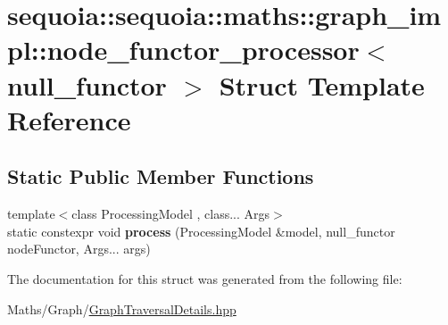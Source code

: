 \hypertarget{structsequoia_1_1sequoia_1_1maths_1_1graph__impl_1_1node__functor__processor_3_01null__functor_01_4}{}\section{sequoia\+::sequoia\+::maths\+::graph\+\_\+impl\+::node\+\_\+functor\+\_\+processor$<$ null\+\_\+functor $>$ Struct Template Reference}
\label{structsequoia_1_1sequoia_1_1maths_1_1graph__impl_1_1node__functor__processor_3_01null__functor_01_4}
\subsection*{Static Public Member Functions}
\begin{DoxyCompactItemize}
\item 
\mbox{\label{structsequoia_1_1sequoia_1_1maths_1_1graph__impl_1_1node__functor__processor_3_01null__functor_01_4_ac6a58698cb3b68ed2d7ea0a1ca32aa84}} 
{\footnotesize template$<$class Processing\+Model , class... Args$>$ }\\static constexpr void {\bfseries process} (Processing\+Model \&model, null\+\_\+functor node\+Functor, Args... args)
\end{DoxyCompactItemize}


The documentation for this struct was generated from the following file\+:\begin{DoxyCompactItemize}
\item 
Maths/\+Graph/\mbox{\hyperlink{_graph_traversal_details_8hpp}{Graph\+Traversal\+Details.\+hpp}}\end{DoxyCompactItemize}
